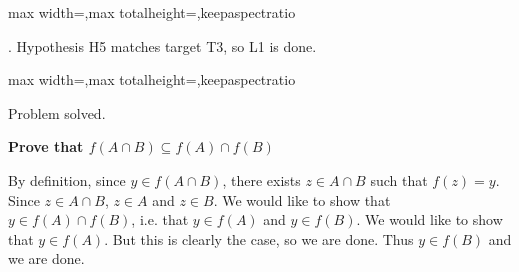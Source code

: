 \documentclass[a4paper,twoside,12pt]{article} %
\makeatletter
\DeclareRobustCommand{\_}{%
  \leavevmode\vbox{%
    \hrule\@width.4em
          \@height-.16ex
          \@depth\dimexpr.16ex+.28pt\relax}}
\newcommand\Tstrut{\rule{0pt}{2.4ex}}
\newcommand\Bstrut{\rule[-1.1ex]{0pt}{0pt}}
\newenvironment{fit}{\begin{adjustbox}{max width=\textwidth,max totalheight=\textheight,keepaspectratio}}{\end{adjustbox}}
\makeatother
\begin{document}
\begin{steps}
\begin{fit}
%
\end{fit}
\smallskip

. Hypothesis H5 matches target T3, so L1 is done.\nopagebreak[4] 
\nopagebreak[4] 
\smallskip\nopagebreak[4] 

\begin{fit}%
\end{fit}

Problem solved.
\cleardoublepage

\end{steps}
{\begin{center} \large \textbf{Prove that $f(A \cap B) \subseteq f(A) \cap f(B)$}\end{center}}\nopagebreak[4]

\begin{center}
\begin{minipage}{120mm}
By definition, since $y\in f(A\cap B)$, there exists $z\in A\cap B$ such that $f(z) = y$. Since $z\in A\cap B$, $z\in A$ and $z\in B$. We would like to show that $y\in f(A)\cap f(B)$, i.e. that $y\in f(A)$ and $y\in f(B)$. We would like to show that $y\in f(A)$. But this is clearly the case, so we are done. Thus $y\in f(B)$ and we are done.
\end{minipage}
\end{center}
\end{document}
